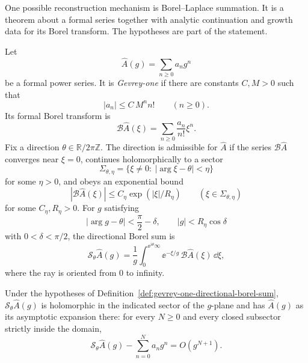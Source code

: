 One possible reconstruction mechanism is Borel--Laplace summation.  It is a
theorem about a formal series together with analytic continuation and growth
data for its Borel transform.  The hypotheses are part of the statement.

\begin{definition}
\label{def:gevrey-one-directional-borel-sum}
Let
\[
  \widehat A(g)=\sum_{n\ge0}a_n g^n
\]
be a formal power series.  It is \emph{Gevrey-one} if there are constants
\(C,M>0\) such that
\[
  |a_n|\le C\,M^n n!
  \qquad(n\ge0).
\]
Its formal Borel transform is
\begin{equation}
  \mathcal B\widehat A(\xi)
  =
  \sum_{n\ge0}\frac{a_n}{n!}\xi^n .
  \label{eq:formal-borel-transform}
\end{equation}
Fix a direction \(\theta\in\mathbb R/2\pi\mathbb Z\).  The direction is
admissible for \(\widehat A\) if the series
\(\mathcal B\widehat A\) converges near \(\xi=0\), continues holomorphically
to a sector
\[
  \Sigma_{\theta,\eta}
  =
  \{\xi\ne0:\ |\arg\xi-\theta|<\eta\}
\]
for some \(\eta>0\), and obeys an exponential bound
\begin{equation}
  |\mathcal B\widehat A(\xi)|
  \le C_\eta \exp(|\xi|/R_\eta)
  \qquad(\xi\in\Sigma_{\theta,\eta})
  \label{eq:borel-exponential-bound}
\end{equation}
for some \(C_\eta,R_\eta>0\).  For \(g\) satisfying
\[
  |\arg g-\theta|<\frac\pi2-\delta,
  \qquad
  |g|<R_\eta\cos\delta
\]
with \(0<\delta<\pi/2\), the directional Borel sum is
\begin{equation}
  \mathcal S_\theta \widehat A(g)
  =
  \frac1g\int_0^{\ee^{i\theta}\infty}
  \ee^{-\xi/g}\,\mathcal B\widehat A(\xi)\,\dd\xi ,
  \label{eq:directional-borel-sum}
\end{equation}
where the ray is oriented from \(0\) to infinity.
\end{definition}

\begin{theorem}
\label{thm:watson-borel-laplace}
Under the hypotheses of Definition~\ref{def:gevrey-one-directional-borel-sum},
\(\mathcal S_\theta\widehat A(g)\) is holomorphic in the indicated sector of
the \(g\)-plane and has \(\widehat A(g)\) as its asymptotic expansion there:
for every \(N\ge0\) and every closed subsector strictly inside the domain,
\begin{equation}
  \mathcal S_\theta\widehat A(g)
  -
  \sum_{n=0}^N a_n g^n
  =
  O(g^{N+1}).
  \label{eq:borel-watson-remainder}
\end{equation}
\end{theorem}

